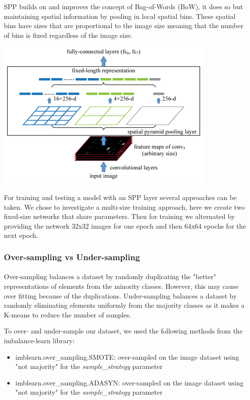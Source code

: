\documentclass{article}
\begin{document}
SPP builds on and improves the concept of Bag-of-Words (BoW), it does so but maintaining spatial information by pooling in local spatial bins. These spatial bins have sizes that are proportional to the image size meaning that the number of bins is fixed regardless of the image size.

\includegraphics{spp}

For training and testing a model with an SPP layer several approaches can be taken. We chose to investigate a multi-size training approach, here we create two fixed-size networks that share parameters. Then for training we alternated by providing the network 32x32 images for one epoch and then 64x64 epochs for the next epoch. 

\subsubsection{Over-sampling vs Under-sampling}
\paragraph{}
Over-sampling balances a dataset by randomly duplicating the "better" representations of elements from the minority classes. However, this may cause over fitting because of the duplications. Under-sampling balances a dataset by randomly eliminating elements uniformly from the majority classes as it makes a K-means to reduce the number of samples. 

To over- and under-sample our dataset, we used the following methods from the imbalance-learn library:

\begin{itemize}
	\item imblearn.over\_sampling.SMOTE: over-sampled on the image dataset using "not majority" for the \textit{sample\_strategy} parameter
	
	\item imblearn.over\_sampling.ADASYN: over-sampled on the image dataset using "not majority" for the \textit{sample\_strategy} parameter
	
\end{itemize}
\end{document}

